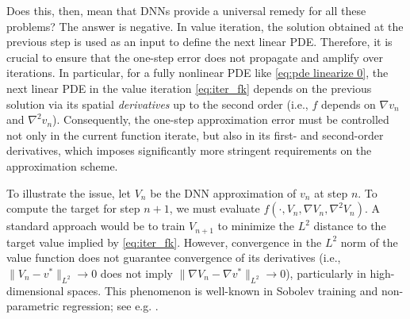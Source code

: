 \documentclass[twoside,11pt]{article}
\newcommand{\1}{\mathbf{1}}
\numberwithin{equation}{section}
\begin{document}
Does this, then, mean that DNNs provide a universal remedy for all these problems? The answer is negative. In value iteration, the solution obtained at the previous step is used as an input to define the next linear PDE. Therefore, it is crucial to ensure that the one-step error does not propagate and amplify over iterations. In particular, for a fully nonlinear PDE like \eqref{eq:pde linearize 0}, the next linear PDE in the value iteration \eqref{eq:iter_fk} depends on the previous solution via its
spatial {\it derivatives} up to the second order (i.e., $f$ depends on $\nabla v_n$ and $\nabla^2 v_n$).
Consequently, the one-step approximation error must be controlled not only in the current function iterate, but also in its first- and second-order derivatives, which imposes significantly more stringent requirements on the approximation scheme.


To illustrate the issue, let $V_n$ be the DNN approximation of $v_n$ at step $n$. To compute the target for step $n+1$, we must evaluate $f(\cdot, V_n, \nabla V_n, \nabla^2 V_n)$. A standard approach would be to train $V_{n+1}$ to minimize the $L^2$ distance to the target value implied by \eqref{eq:iter_fk}.
However, convergence in the $L^2$ norm of the value function does not guarantee convergence of its derivatives (i.e., $\|V_n - v^*\|_{L^2} \to 0$ does not imply $\|\nabla V_n - \nabla v^*\|_{L^2} \to 0$), particularly in high-dimensional spaces. This phenomenon is well-known in Sobolev training and non-parametric regression; see e.g. \cite{czarnecki2017sobolev}.
\end{document}
